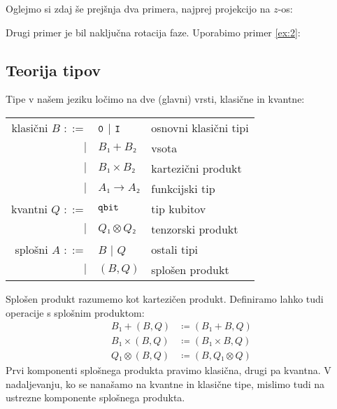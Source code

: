 \begin{example*}\label{ex:5}
    Oglejmo si zdaj še prejšnja dva primera, najprej projekcijo na \(z\)-os:
    \begin{center}
    \end{center}
\end{example*}

\begin{example*}\label{ex:6}
    Drugi primer je bil naključna rotacija faze. Uporabimo primer \ref{ex:2}:
    \begin{center}
    \end{center}
\end{example*}


\subsection{Teorija tipov}

Tipe v našem jeziku ločimo na dve (glavni) vrsti, klasične in kvantne:\\
\begin{tabular}{r l l}%
    klasični \(B\) \(::=\)& \(\text{\ttfamily0}\) \(\mid\) \(\text{\ttfamily I}\)                & osnovni klasični tipi\\
                  \(\mid\)& \(B₁+B₂\)                                      & vsota\\
                  \(\mid\)& \(B₁×B₂\)                                      & kartezični produkt\\
                  \(\mid\)& \(A₁ → A₂\)                                    & funkcijski tip\\
    kvantni \(Q\) \(::=\)&  \(\text{\ttfamily qbit}\)                                      & tip kubitov\\
                 \(\mid\)&  \(Q₁⊗Q₂\)                                     & tenzorski produkt\\
    splošni \(A\) \(::=\)&  \(B\) \(\mid\) \(Q\)                           & ostali tipi\\
                 \(\mid\)&  \((B,Q)\)                                      & splošen produkt\\
\end{tabular}
\begin{remark}
    Splošen produkt razumemo kot kartezičen produkt.
    Definiramo lahko tudi operacije s splošnim produktom:
    \begin{align*}
        B₁+(B,Q) &≔ (B₁+B,Q)\\
        B₁×(B,Q) &≔ (B₁×B,Q)\\
        Q₁⊗(B,Q) &≔ (B,Q₁⊗Q)
    \end{align*}
    Prvi komponenti splošnega produkta pravimo klasična, drugi pa kvantna.
    V nadaljevanju, ko se nanašamo na kvantne in klasične tipe, mislimo tudi na ustrezne komponente splošnega produkta.
\end{remark}

